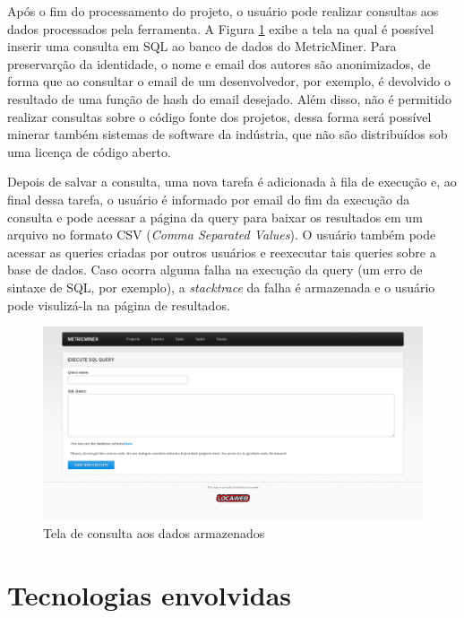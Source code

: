 \documentclass[a4paper, 12pt, twoside]{book}
\begin{document}
        Após o fim do processamento do projeto, o usuário pode realizar consultas aos dados processados pela ferramenta. A Figura \ref{fig:screen_query} exibe a tela na qual é possível inserir uma consulta em SQL ao banco de dados do MetricMiner. Para preservarção da identidade, o nome e email dos autores são anonimizados, de forma que ao consultar o email de um desenvolvedor, por exemplo, é devolvido o resultado de uma função de hash do email desejado. Além disso, não é permitido realizar consultas sobre o código fonte dos projetos, dessa forma será possível minerar também sistemas de software da indústria, que não são distribuídos sob uma licença de código aberto.

        Depois de salvar a consulta, uma nova tarefa é adicionada à fila de execução e, ao final dessa tarefa, o usuário é informado por email do fim da execução da consulta e pode acessar a página da query para baixar os resultados em um arquivo no formato CSV (\textit{Comma Separated Values}). O usuário também pode acessar as queries criadas por outros usuários e reexecutar tais queries sobre a base de dados. Caso ocorra alguma falha na execução da query (um erro de sintaxe de SQL, por exemplo), a \textit{stacktrace} da falha é armazenada e o usuário pode visulizá-la na página de resultados.

        \begin{figure}[ht]
            \centering
            \includegraphics[width=1.00\textwidth]{img/query.png}
            \caption{Tela de consulta aos dados armazenados}
            \label{fig:screen_query}
        \end{figure}
        \clearpage

    \section{Tecnologias envolvidas} \label{sc:tecnologias}
\end{document}
